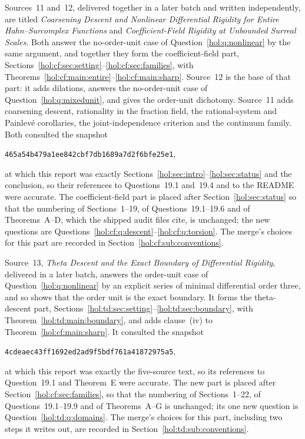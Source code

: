 \documentclass[11pt]{article}
\numberwithin{equation}{section}
\theoremstyle{definition}
\theoremstyle{remark}
\begin{document}
Sources~11 and~12, delivered together in a later batch and written
independently, are titled \emph{Coarsening Descent and Nonlinear Differential
Rigidity for Entire Hahn--Surcomplex Functions} and \emph{Coefficient-Field
Rigidity at Unbounded Surreal Scales}. Both answer the no-order-unit case of
Question~\ref{hol:q:nonlinear} by the same argument, and together they form
the coefficient-field part,
Sections~\ref{hol:cf:sec:setting}--\ref{hol:cf:sec:families}, with
Theorems~\ref{hol:cf:main:entire}--\ref{hol:cf:main:sharp}. Source~12 is the
base of that part: it adds dilations, answers the no-order-unit case of
Question~\ref{hol:q:mixedunit}, and gives the order-unit dichotomy. Source~11
adds coarsening descent, rationality in the fraction field, the rational-system
and Painlev\'e corollaries, the joint-independence criterion and the continuum
family. Both consulted the snapshot
\begin{center}\small\texttt{465a54b479a1ee842cbf7db1689a7d2f6bfe25e1},\end{center}
at which this report was exactly
Sections~\ref{hol:sec:intro}--\ref{hol:sec:status} and the conclusion, so
their references to Questions~19.1 and~19.4 and to the README were accurate.
The coefficient-field part is placed after Section~\ref{hol:sec:status} so
that the numbering of Sections~1--19, of Questions~19.1--19.6 and of
Theorems~A--D, which the shipped audit files cite, is unchanged; the new
questions are Questions~\ref{hol:cf:q:descent}--\ref{hol:cf:q:torsion}. The
merge's choices for this part are recorded in
Section~\ref{hol:cf:sub:conventions}.

Source~13, \emph{Theta Descent and the Exact Boundary of Differential
Rigidity}, delivered in a later batch, answers the order-unit case of
Question~\ref{hol:q:nonlinear} by an explicit series of minimal differential
order three, and so shows that the order unit is the exact boundary. It forms
the theta-descent part,
Sections~\ref{hol:td:sec:setting}--\ref{hol:td:sec:boundary}, with
Theorem~\ref{hol:td:main:boundary}, and adds clause~(iv) to
Theorem~\ref{hol:cf:main:sharp}. It consulted the snapshot
\begin{center}\small\texttt{4cdeaec43ff1692ed2ad9f5bdf761a41872975a5},\end{center}
at which this report was exactly the five-source text, so its references to
Question~19.1 and Theorem~E were accurate. The new part is placed after
Section~\ref{hol:cf:sec:families}, so that the numbering of Sections~1--22, of
Questions~19.1--19.9 and of Theorems~A--G is unchanged; its one new question is
Question~\ref{hol:td:q:domains}. The merge's choices for this part, including
two steps it writes out, are recorded in
Section~\ref{hol:td:sub:conventions}.
\end{document}
